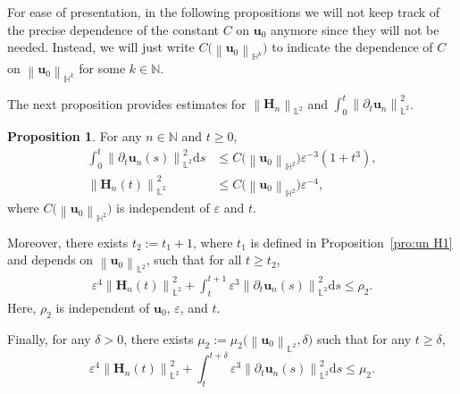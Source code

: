 \documentclass[11pt, reqno]{amsart}
\theoremstyle{definition}
\newtheorem{proposition}[theorem]{Proposition}
\numberwithin{equation}{section}
\newcommand{\bff}{\boldsymbol}
\newcommand{\bb}{\mathbb}
\newcommand{\ds}{\mathrm{d}s}
\newcommand{\bl}[1]{{\color{blue}{#1}}}
\newcommand{\norm}[2]{\left\|{#1}\right\|_{#2}}
\begin{document}
For ease of presentation, in the following propositions we will not keep track of the precise dependence of the constant $C$ on $\bff{u}_0$ anymore since they will not be needed. Instead, we will just write $C\big(\norm{\bff{u}_0}{\bb{H}^k}\big)$ to indicate the dependence of $C$ on $\norm{\bff{u}_0}{\bb{H}^k}$ for some $k\in \bb{N}$. 

The next proposition provides estimates for $\norm{\bff{H}_n}{\bb{L}^2}$ and $\int_0^t \norm{\partial_t \bff{u}_n}{\bb{L}^2}^2$.

\begin{proposition}\label{pro:H L2 dt uh L2}
	For any $n\in \bb{N}$ and $t\geq 0$,
	\begin{align}
        \label{equ:H L2 dt uh L2}
		\int_0^t \norm{\partial_t \bff{u}_n(s)}{\bb{L}^2}^2 \ds
		&\leq 
		C\big(\norm{\bff{u}_0}{\bb{H}^2}\big)  \varepsilon^{-3} \left(1+t^3\right),
        \\
        \label{equ:unif H2 Hn}
        \norm{\bff{H}_n(t)}{\bb{L}^2}^2
        &\leq
        C\big(\norm{\bff{u}_0}{\bb{H}^2}\big)  \varepsilon^{-4},
	\end{align}
	where $C\big(\norm{\bff{u}_0}{\bb{H}^2}\big)$ is independent of $\varepsilon$ and $t$.
	
	Moreover, there exists $t_2:=t_1+1$, where $t_1$ is defined in Proposition~\ref{pro:un H1} and depends on $\norm{\bff{u}_0}{\bb{L}^2}$, such that for all $t\geq t_2$,
	\begin{align}\label{equ:sigma 2}
		\varepsilon^4 \norm{\bff{H}_n(t)}{\bb{L}^2}^2 
		+
		\int_t^{t+1} \varepsilon^3 \norm{\partial_t \bff{u}_n(s)}{\bb{L}^2}^2 \ds 
		\leq \rho_2.
	\end{align}
	Here, $\rho_2$ is independent of $\bff{u}_0$, $\varepsilon$, and $t$.
	
	Finally, for any $\delta>0$, there exists $\mu_2:= \mu_2\big(\norm{\bff{u}_0}{\bb{L}^2}, \delta\big)$ such that for any $t\geq \delta$,
	\begin{equation}\label{equ:Hn L2 mu}
		\varepsilon^4 \norm{\bff{H}_n(t)}{\bb{L}^2}^2 
		+
		\int_t^{t+\delta} \varepsilon^3 \norm{\partial_t \bff{u}_n(s)}{\bb{L}^2}^2 \ds 
		\leq \mu_2.
	\end{equation}
\end{proposition}
\end{document}
